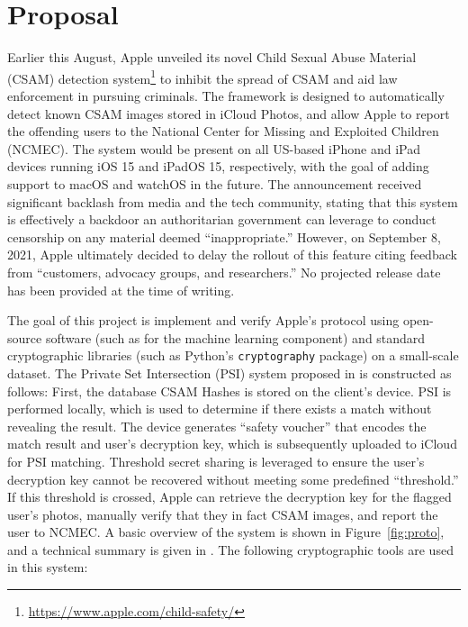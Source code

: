 
\section{Proposal} %
\label{sec:proposal}


Earlier this August, Apple unveiled its novel Child Sexual Abuse Material (CSAM) detection system\footnote{\url{https://www.apple.com/child-safety/}} to inhibit the spread of CSAM and aid law enforcement in pursuing criminals. The framework is designed to automatically detect known CSAM images stored in iCloud Photos, and allow Apple to report the offending users to the National Center for Missing and Exploited Children (NCMEC). The system would be present on all US-based iPhone and iPad devices running iOS 15 and iPadOS 15, respectively, with the goal of adding support to macOS and watchOS in the future. The announcement received significant backlash from media and the tech community, stating that this system is effectively a backdoor an authoritarian government can leverage to conduct censorship on any material deemed ``inappropriate.'' However, on September 8, 2021, Apple ultimately decided to delay the rollout of this feature citing feedback from ``customers, advocacy groups, and researchers.'' No projected release date has been provided at the time of writing.

The goal of this project is implement and verify Apple's protocol using open-source software (such as \cite{athalyeNeuralHashCollider2021,ygvarAppleNeuralHash2ONNX2021,cheerlaNeuralHashAdversarialSteganographic2021} for the machine learning component) and standard cryptographic libraries (such as Python's \texttt{cryptography} package) on a small-scale dataset. The Private Set Intersection (PSI) system proposed in \cite{bhowmick2021apple} is constructed as follows: First, the database CSAM Hashes is stored on the client's device. PSI is performed locally, which is used to determine if there exists a match without revealing the result. The device generates ``safety voucher'' that encodes the match result and user's decryption key, which is subsequently uploaded to iCloud for PSI matching. Threshold secret sharing is leveraged to ensure the user's decryption key cannot be recovered without meeting some predefined ``threshold.'' If this threshold is crossed, Apple can retrieve the decryption key for the flagged user's photos, manually verify that they in fact CSAM images, and report the user to NCMEC. A basic overview of the system is shown in Figure~\ref{fig:proto}, and a technical summary is given in \cite{CSAMDetectionTechnical2021}. The following cryptographic tools are used in this system: 

